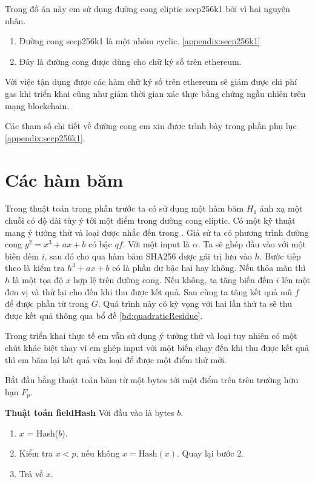 \documentclass[../main.tex]{subfiles}
\begin{document}
Trong đồ án này em sử dụng đường cong eliptic secp256k1 bởi vì hai nguyên nhân.
\begin{enumerate}
    \item Đường cong secp256k1 là một nhóm cyclic. \ref{appendix:secp256k1}
    \item Đây là đường cong được dùng cho chữ ký số trên ethereum.
\end{enumerate}
Với việc tận dụng được các hàm chữ ký số trên ethereum sẽ giảm được chi phí gas khi triển khai cũng như giảm thời gian xác thực bằng chứng ngẫu nhiên trên mạng blockchain. 

Các tham số chi tiết về đường cong em xin được trình bày trong phần phụ lục \ref{appendix:secp256k1}.

\section{Các hàm băm}
Trong thuật toán trong phần trước ta có sử dụng một hàm băm $H_1$ ánh xạ một chuỗi có độ dài tùy ý tới một điểm trong đường cong eliptic. Có một kỹ thuật mang ý tưởng thử và loại được nhắc đến trong \cite{icart2009hash}. Giả sử ta có phương trình đường cong $y^2 = x^3 +ax+b$ có bậc $qf$. Với một input là $\alpha$. Ta sẽ ghép đầu vào với một biến đếm $i$, sau đó cho qua hàm băm SHA256 được gái trị lưu vào $h$. Bước tiếp theo là kiểm tra $h^3+ax+b$ có là phần dư bậc hai hay không. Nếu thỏa mãn thì $h$ là một tọa độ $x$ hợp lệ trên đường cong. Nếu không, ta tăng biến đếm $i$ lên một đơn vị và thử lại cho đến khi thu được kết quả. Sau cùng ta tăng kết quả mũ $f$ để được phần tử trong $G$. 
Quá trình này có kỳ vọng với hai lần thử ta sẽ thu được kết quả thông qua bổ đề \ref{bd:quadraticResidue}.

Trong triển khai thực tế em vẫn sử dụng ý tưởng thử và loại tuy nhiên có một chút khác biệt thay vì em ghép input với một biến chạy đến khi thu được kết quả thì em băm lại kết quả vừa loại để được một điểm thử mới.

Bắt đầu bằng thuật toán băm từ một bytes tới một điểm trên trên trường hữu hạn $F_p$. 

\textbf{Thuật toán fieldHash} Với đầu vào là bytes $b$.
\begin{enumerate}
    \item $x$ = Hash($b$).
    \item Kiểm tra $x < p$, nếu không $x =\text{Hash}(x)$. Quay lại bước 2.
    \item Trả về $x$.
\end{enumerate}
\end{document}
